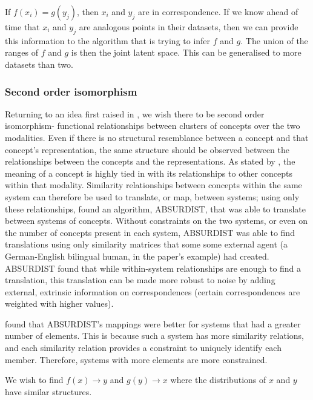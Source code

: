 If $f(x_i) = g(y_j)$, then $x_i$ and $y_j$ are in correspondence. If we know ahead of time that $x_i$ and $y_j$ are analogous points in their datasets, then we can provide this information to the algorithm that is trying to infer $f$ and $g$. The union of the ranges of $f$ and $g$ is then the joint latent space. This can be generalised to more datasets than two. 

\subsubsection{Second order isomorphism}

Returning to an idea first raised in \cite{SHEPARD19701}, we wish there to be second order isomorphism- functional relationships between clusters of concepts over the two modalities. Even if there is no structural resemblance between a concept and that concept's representation, the same structure should be observed between the relationships between the concepts  and the representations. As stated by \cite{GOLDSTONE2002295}, the meaning of a concept is highly tied in with its relationships to other concepts within that modality. Similarity relationships between concepts within the same system can therefore be used to translate, or map, between systems; using only these relationships, \cite{GOLDSTONE2002295} found an algorithm, ABSURDIST, that was able to translate between systems of concepts. Without constraints on the two systems, or even on the number of concepts present in each system, ABSURDIST was able to find translations using only similarity matrices that some some external agent (a German-English bilingual human, in the paper's example) had created. ABSURDIST found that while within-system relationships are enough to find a translation, this translation can be made more robust to noise by adding external, extrinsic information on correspondences (certain correspondences are weighted with higher values). 

\cite{GOLDSTONE2002295} found that ABSURDIST's mappings were better for systems that had a greater number of elements. This is because such a system has more similarity relations, and each similarity relation provides a constraint to uniquely identify each member. Therefore, systems with more elements are more constrained. 

We wish to find $f(x) \rightarrow y$ and $g(y) \rightarrow x$ where the distributions of $x$ and $y$  have similar structures. 

